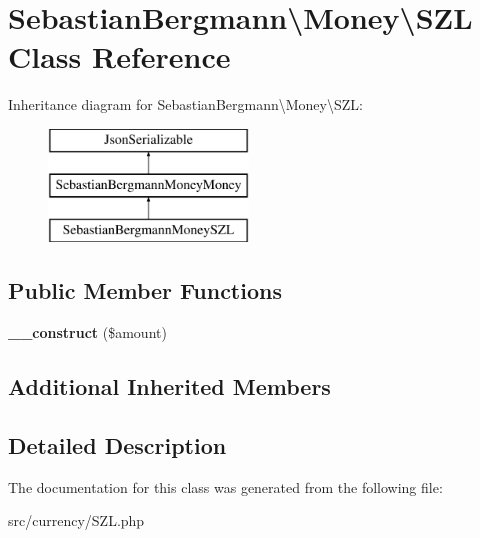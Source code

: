 \hypertarget{classSebastianBergmann_1_1Money_1_1SZL}{}\section{Sebastian\+Bergmann\textbackslash{}Money\textbackslash{}S\+Z\+L Class Reference}
\label{classSebastianBergmann_1_1Money_1_1SZL}
Inheritance diagram for Sebastian\+Bergmann\textbackslash{}Money\textbackslash{}S\+Z\+L\+:\begin{figure}[H]
\begin{center}
\leavevmode
\includegraphics[height=3.000000cm]{classSebastianBergmann_1_1Money_1_1SZL}
\end{center}
\end{figure}
\subsection*{Public Member Functions}
\begin{DoxyCompactItemize}
\item 
\hypertarget{classSebastianBergmann_1_1Money_1_1SZL_abc202b96e2602e185185bc450c8be913}{}{\bfseries \+\_\+\+\_\+construct} (\$amount)\label{classSebastianBergmann_1_1Money_1_1SZL_abc202b96e2602e185185bc450c8be913}

\end{DoxyCompactItemize}
\subsection*{Additional Inherited Members}


\subsection{Detailed Description}


The documentation for this class was generated from the following file\+:\begin{DoxyCompactItemize}
\item 
src/currency/S\+Z\+L.\+php\end{DoxyCompactItemize}
